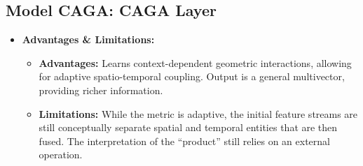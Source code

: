 \documentclass[11pt]{article}
\newcommand{\Cl}[2]{\text{Cl}(#1, #2)} %
\newcommand{\Hs}{h_S} %
\newcommand{\Ht}{h_T} %
\newcommand{\Svec}{\mathbf{S}} %
\newcommand{\Tvec}{\mathbf{T}} %
\newcommand{\Mvec}{\mathbf{M}} %
\newcommand{\MPN}{\text{MPN}}
\newenvironment{modeldescription}[1]{%
    \subsection*{Model #1: \MakeUppercase{#1} Layer}%
    \begin{itemize}[leftmargin=*,noitemsep]%
}{%
    \end{itemize}%
}
\begin{document}
\begin{modeldescription}{CAGA}
\begin{enumerate}[noitemsep]
        \begin{itemize}[noitemsep]
            \item \textbf{Spatial Multivector Projection Network ($P_{S,multi}$):} Takes $\Hs(k)$ and outputs coefficients for a general spatial multivector $\Svec_k \in \Cl{d_s}{0}$. This $\Svec_k$ can have components across multiple grades (scalar, vector, bivector, etc., formed only by spatial basis vectors).
                \begin{itemize}[noitemsep]
                    \item \texttt{S\_k\_multivector\_coeffs = P\_S\_multi(Hs(k))} (tensor of shape \texttt{(2^ds,)} representing coefficients of all spatial basis blades).
                \end{itemize}
            \item \textbf{Temporal Multivector Projection Network ($P_{T,multi}$):} Takes $\Ht(k)$ and outputs coefficients for a general temporal multivector $\Tvec_k \in \Cl{0}{d_t}$. (Similarly, tensor of shape \texttt{(2^dt,)} for temporal basis blades).
        \end{itemize}
        \item \textbf{Context-Adaptive Geometric Product Fusion:}
        \begin{itemize}[noitemsep]
            \item Compute the geometric product: $\Mvec_k = \Svec_k * \Tvec_k$.
            \item This product is computed \textbf{using the learned local metric $\mathbf{G}_k^{local}$} from \MPN.
            \item Because the cross-space inner products $e_i(k) \cdot f_j(k)$ can now be non-zero, the inner product part $\Svec_k \cdot \Tvec_k$ will generally \textbf{not vanish}.
            \item Therefore, $\Mvec_k$ will be a \textbf{general multivector} (a sum of different grades: scalar, vector, bivector, etc.).
        \end{itemize}
        \item \textbf{Output:} $\Mvec_k \in \Cl{d_s}{d_t}$ (a general multivector with learned basis properties). Output is a tensor of shape \texttt{(2^(ds+dt),)}.
    \end{enumerate}

    \item \textbf{Advantages \& Limitations:}
    \begin{itemize}[noitemsep]
        \item \textbf{Advantages:} Learns context-dependent geometric interactions, allowing for adaptive spatio-temporal coupling. Output is a general multivector, providing richer information.
        \item \textbf{Limitations:} While the metric is adaptive, the initial feature streams are still conceptually separate spatial and temporal entities that are then fused. The interpretation of the ``product'' still relies on an external operation.
    \end{itemize}
\end{modeldescription}
\end{document}
